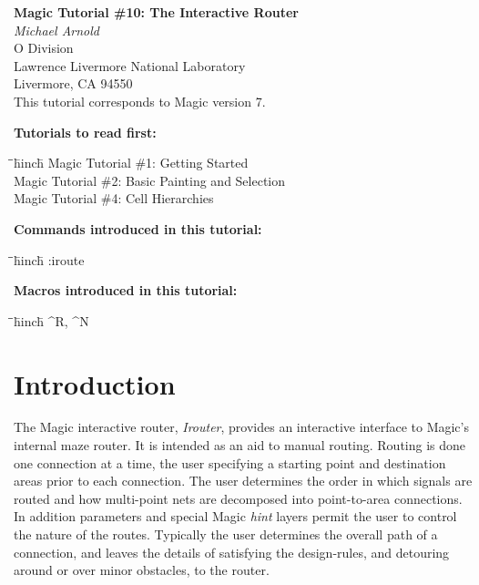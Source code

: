 \documentclass[letterpaper,twoside,12pt]{article}
\def\hinch{\hspace*{0.5in}}
\def\starti{\begin{center}\begin{tabbing}\hinch\=\hinch\=\hinch\=hinch\hinch\=\kill}
\def\endi{\end{tabbing}\end{center}}
\def\mytitle{Magic Tutorial \#10: The Interactive Router}
\begin{document}
\makeatletter
\newcommand{\ps@magic}{%
	\renewcommand{\@oddhead}{\mytitle\hfil\today}%
	\renewcommand{\@evenhead}{\today\hfil\mytitle}%
	\renewcommand{\@evenfoot}{\hfil\textrm{--{\thepage}--}\hfil}%
	\renewcommand{\@oddfoot}{\@evenfoot}}
\newcommand{\ps@mplain}{%
	\renewcommand{\@oddhead}{}%
	\renewcommand{\@evenhead}{}%
	\renewcommand{\@evenfoot}{\hfil\textrm{--{\thepage}--}\hfil}%
	\renewcommand{\@oddfoot}{\@evenfoot}}
\makeatother
\pagestyle{magic}
\thispagestyle{mplain}


\begin{center}
  {\bfseries \Large \mytitle} \\
  \vspace*{0.5in}
  {\itshape Michael Arnold} \\
  \vspace*{0.5in}
   O Division \\
   Lawrence Livermore National Laboratory \\
   Livermore, CA  94550 \\
  \vspace*{0.25in}
  This tutorial corresponds to Magic version 7. \\
\end{center}
\vspace*{0.5in}

{\noindent\bfseries\large Tutorials to read first:}
\starti
   \> Magic Tutorial \#1: Getting Started \\
   \> Magic Tutorial \#2: Basic Painting and Selection \\
   \> Magic Tutorial \#4: Cell Hierarchies
\endi

{\noindent\bfseries\large Commands introduced in this tutorial:}
\starti
   \> :iroute
\endi

{\noindent\bfseries\large Macros introduced in this tutorial:}

\starti
   \> \^{}R, \^{}N
\endi

\vspace*{0.25in}
\section{Introduction}

The Magic interactive router, {\itshape Irouter}, provides an interactive interface
to Magic's internal maze router.  It is intended as an aid to manual
routing.  Routing is done one connection at a time, the user specifying 
a starting point and destination areas prior to each connection.  The user 
determines the order in which signals are routed and how multi-point nets
are decomposed into point-to-area connections.  In addition parameters and
special Magic {\itshape hint} layers permit the user to control the nature
of the routes.  Typically the user determines the overall path of a connection,
and leaves the details of satisfying the design-rules, and detouring around or 
over minor obstacles, to the router.
\end{document}

